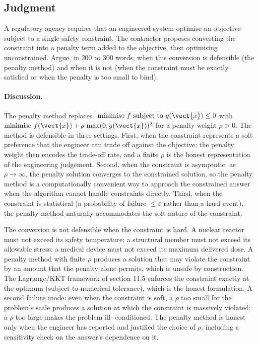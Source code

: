 \subsection*{Judgment}

\begin{exercise}
A regulatory agency requires that an engineered system optimise an
objective subject to a single safety constraint. The contractor
proposes converting the constraint into a penalty term added to
the objective, then optimising unconstrained. Argue, in 200 to 300
words, when this conversion is defensible (the penalty method) and
when it is not (when the constraint must be exactly satisfied or
when the penalty is too small to bind).

\paragraph{Discussion.} The penalty method replaces $\text{
minimise } f \text{ subject to } g(\vect{x}) \leq 0$ with
$\text{minimise } f(\vect{x}) + \rho\,\max(0, g(\vect{x}))^{2}$ for
a penalty weight $\rho > 0$. The method is defensible in three
settings. First, when the constraint represents a soft preference
that the engineer can trade off against the objective; the penalty
weight then encodes the trade-off rate, and a finite $\rho$ is the
honest representation of the engineering judgement. Second, when
the constraint is asymptotic: as $\rho \to \infty$, the penalty
solution converges to the constrained solution, so the penalty
method is a computationally convenient way to approach the
constrained answer when the algorithm cannot handle constraints
directly. Third, when the constraint is statistical (a probability
of failure $\leq \varepsilon$ rather than a hard event), the
penalty method naturally accommodates the soft nature of the
constraint.

The conversion is not defensible when the constraint is hard. A
nuclear reactor must not exceed its safety temperature; a structural
member must not exceed its allowable stress; a medical device must
not exceed its maximum delivered dose. A penalty method with finite
$\rho$ produces a solution that may violate the constraint by an
amount that the penalty alone permits, which is unsafe by
construction. The Lagrange/KKT framework of section 11.5 enforces
the constraint exactly at the optimum (subject to numerical
tolerance), which is the honest formulation. A second failure mode:
even when the constraint is soft, a $\rho$ too small for the
problem's scale produces a solution at which the constraint is
massively violated; a $\rho$ too large makes the problem ill-
conditioned. The penalty method is honest only when the engineer
has reported and justified the choice of $\rho$, including a
sensitivity check on the answer's dependence on it.
\end{exercise}

